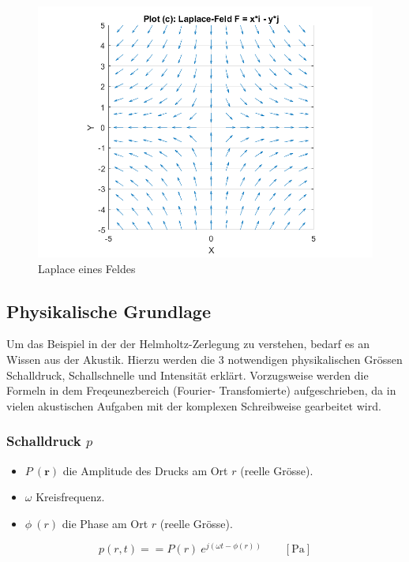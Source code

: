 \begin{figure}[h!]
	\centering
	\includegraphics[scale=0.4]{papers/helmholtz/images/Laplace_Feld.png}
	\caption{Laplace eines Feldes}
	\label{fig:LaplaceAlg}
\end{figure}


\subsection{Physikalische Grundlage}

Um das Beispiel in der der Helmholtz-Zerlegung zu verstehen, bedarf es an Wissen aus der Akustik. Hierzu werden die 3 notwendigen physikalischen Grössen Schalldruck, Schallschnelle und Intensität erklärt. Vorzugsweise werden die Formeln in dem Freqeunezbereich (Fourier- Transfomierte) aufgeschrieben, da in vielen akustischen Aufgaben mit der komplexen Schreibweise gearbeitet wird.


\subsubsection{Schalldruck $p$}
\begin{itemize}
\item $P \: (\mathbf{r})$ die Amplitude des Drucks am Ort $r$ (reelle Grösse).
\item $\omega$ Kreisfrequenz.
\item $\phi \: (r)$ die Phase am Ort $r$ (reelle Grösse).
\end{itemize}

\begin{equation}
p(r,t) =  = P(r) \: e^{j( \omega t - \phi(r))} \qquad [\si{\pascal}]
\end{equation}

